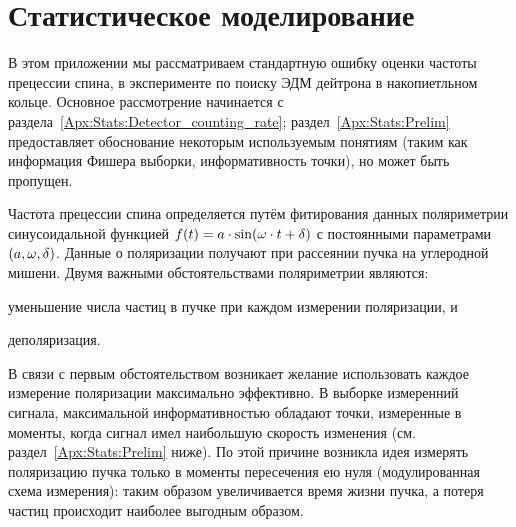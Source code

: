 \newcommand{\cnt}{c}
\newcommand{\meas}{\epsilon}
\newcommand{\dt}{\Delta t}
\newcommand{\dtm}{\dt_{\meas}}
\newcommand{\dtc}{\dt_{\cnt}}
\newcommand{\Ncm}{{n_{\sfrac{\cnt}{\meas}}}}
\newcommand{\Nmnd}{{n_{\sfrac{\meas}{zc}}}}
\newcommand{\Nnd}{{n_{zc}}}
\newcommand{\Nm}{{n_{\meas}}}
\newcommand{\Ncnt}{{n_{\cnt}}}
\newcommand{\LTb}{\tau_b}
\newcommand{\LTd}{\tau_d}
\newcommand{\lamb}{\lambda_b}
\newcommand{\lamd}{\lambda_d}

\newcommand{\pars}{\boldsymbol{\theta}}
\DeclareDocumentCommand{\XpctO}{m}{\Xpct{#1}[\pars_0]}
\DeclareDocumentCommand{\Fisher}{O{}D(){\pars_0}}{I_{#1}(#2)}
\newcommand{\y}{\mathbf{y}}


\chapter{Статистическое моделирование}\label{Apx:Stats}
В этом приложении мы рассматриваем стандартную ошибку оценки частоты прецессии спина, в эксперименте по поиску
ЭДМ дейтрона в накопиетльном кольце. Основное рассмотрение начинается с раздела~\ref{Apx:Stats:Detector_counting_rate}; раздел~\ref{Apx:Stats:Prelim} предоставляет обоснование некоторым используемым понятиям (таким как информация Фишера выборки, информативность точки), но может быть пропущен.

Частота прецессии спина определяется путём фитирования данных поляриметрии синусоидальной функцией
 $f(t) = a\cdot\sin(\omega\cdot t + \delta)$ с постоянными параметрами $(a,\omega,\delta)$. Данные о поляризации получают при 
рассеянии пучка на углеродной мишени. Двумя важными обстоятельствами поляриметрии являются:
\begin{enumerate*}
	\item уменьшение числа частиц в пучке при каждом измерении поляризации, и
	\item деполяризация.
\end{enumerate*}

В связи с первым обстоятельством возникает желание использовать каждое измерение поляризации максимально эффективно. В выборке измеренний сигнала, максимальной информативностью обладают точки, измеренные в моменты, когда сигнал имел наибольшую скорость изменения (см. раздел~\ref{Apx:Stats:Prelim} ниже). По этой причине возникла идея измерять поляризацию пучка только в моменты пересечения ею нуля (модулированная схема измерения): таким образом увеличивается время жизни пучка, а потеря частиц происходит наиболее выгодным образом. 

